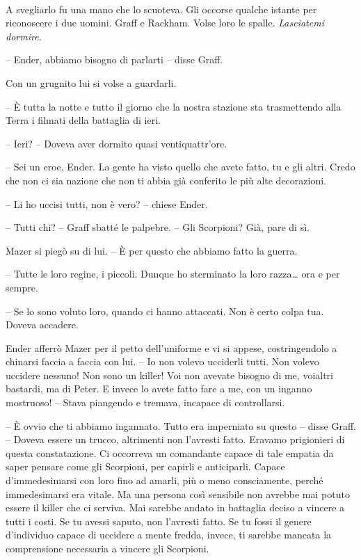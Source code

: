 {~}

{A svegliarlo fu una mano che lo scuoteva. Gli occorse qualche istante
	per riconoscere i due uomini. Graff e Rackham. Volse loro le spalle.
	\emph{Lasciatemi dormire.}}

{-- Ender, abbiamo bisogno di parlarti -- disse Graff.}

{Con un grugnito lui si volse a guardarli.}

{-- È tutta la notte e tutto il giorno che la nostra stazione sta
	trasmettendo alla Terra i filmati della battaglia di ieri.}

{-- Ieri? -- Doveva aver dormito quasi ventiquattr'ore.}

{-- Sei un eroe, Ender. La gente ha visto quello che avete fatto, tu e
	gli altri. Credo che non ci sia nazione che non ti abbia già conferito
	le più alte decorazioni.}

{-- Li ho uccisi tutti, non è vero? -- chiese Ender.}

{-- Tutti chi? -- Graff sbatté le palpebre. -- Gli Scorpioni? Già, pare
	di sì.}

{Mazer si piegò su di lui. -- È per questo che abbiamo fatto la guerra.}

{-- Tutte le loro regine, i piccoli. Dunque ho sterminato la loro
	razza\ldots{} ora e per sempre.}

{-- Se lo sono voluto loro, quando ci hanno attaccati. Non è certo colpa
	tua. Doveva accadere.}

{Ender afferrò Mazer per il petto dell'uniforme e vi si appese,
	costringendolo a chinarsi faccia a faccia con lui. -- Io non volevo
	ucciderli tutti. Non volevo uccidere nessuno! Non sono un killer! Voi
	non avevate bisogno di me, voialtri bastardi, ma di Peter. E invece lo
	avete fatto fare a me, con un inganno mostruoso! -- Stava piangendo e
	tremava, incapace di controllarsi.}

{-- È ovvio che ti abbiamo ingannato. Tutto era imperniato su questo --
	disse Graff. -- Doveva essere un trucco, altrimenti non l'avresti fatto.
	Eravamo prigionieri di questa constatazione. Ci occorreva un comandante
	capace di tale empatia da saper pensare come gli Scorpioni, per capirli
	e anticiparli. Capace d'immedesimarsi con loro fino ad amarli, più o
	meno consciamente, perché immedesimarsi era vitale. Ma una persona così
	sensibile non avrebbe mai potuto essere il killer che ci serviva. Mai
	sarebbe andato in battaglia deciso a vincere a tutti i costi. Se tu
	avessi saputo, non l'avresti fatto. Se tu fossi il genere d'individuo
	capace di uccidere a mente fredda, invece, ti sarebbe mancata la
	comprensione necessaria a vincere gli Scorpioni.}

